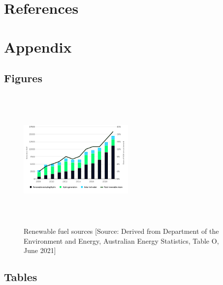 \documentclass[mstat,12pt]{unswthesis}
\begin{document}
\chapter*{References}\label{references}

 


\chapter*{Appendix}\label{appendix}

\section*{\texorpdfstring{\textbf{Figures}}{Figures}}\label{figures}

\begin{figure}[H]
\centering
\includegraphics[width=0.5\textwidth,height=7cm]{renewable_fuel_sources_chart.png}
\caption{Renewable fuel sources [Source:
Derived from Department of the Environment and Energy, Australian Energy Statistics, Table O, June 2021]}\label{renewable}
\end{figure}

\section*{\texorpdfstring{\textbf{Tables}}{Tables}}\label{tables}
\end{document}
